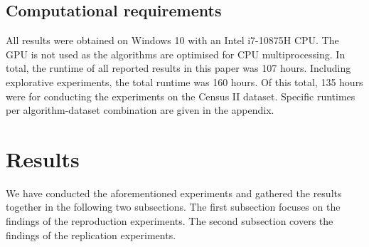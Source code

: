 \subsection{Computational requirements}
All results were obtained on Windows 10 with an Intel i7-10875H CPU. The GPU is not used as the algorithms are optimised for CPU multiprocessing. In total, the runtime of all reported results in this paper was 107 hours. Including explorative experiments, the total runtime was 160 hours. Of this total, 135 hours were for conducting the experiments on the Census II dataset. Specific runtimes per algorithm-dataset combination are given in the appendix.



\section{Results}\label{sec:results}
We have conducted the aforementioned experiments and gathered the results together in the following two subsections. The first subsection focuses on the findings of the reproduction experiments. The second subsection covers the findings of the replication experiments.

